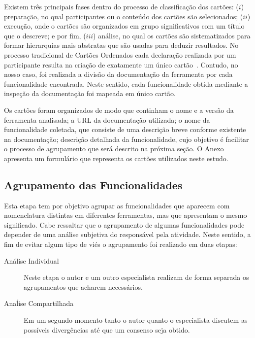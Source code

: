 Existem três principais fases dentro do processo de classificação dos cartões:
($i$) preparação, no qual participantes ou o conteúdo dos cartões são selecionados;
($ii$) execução, onde o cartões são organizados em grupo significativos com um
título que o descreve; e por fim, ($iii$) análise, no qual os cartões são
sistematizados para formar hierarquias mais abstratas que são usadas para
deduzir resultados. No processo tradicional de Cartões Ordenados cada declaração
realizada por um participante resulta na criação de exatamente um único
cartão~\cite{just2008towards}. Contudo, no nosso caso, foi realizada a divisão
da documentação da ferramenta por cada funcionalidade encontrada. Neste sentido,
cada funcionalidade obtida mediante a inspeção da documentação foi mapeada em
único cartão.

Os cartões foram organizados de modo que continham o nome e a versão da
ferramenta analisada; a URL da documentação utilizada; o nome da funcionalidade
coletada, que consiste de uma descrição breve conforme existente na
documentação; descrição detalhada da funcionalidade, cujo objetivo é facilitar o
processo de agrupamento que será descrito na próxima seção. O
Anexo~\cite{ch:app-form-cartoes-ordenados} apresenta um formulário que
representa os cartões utilizados neste estudo.

\subsection{Agrupamento das Funcionalidades}
\label{subsec:agrupamento_fucionalidades}

Esta etapa tem por objetivo agrupar as funcionalidades que aparecem com
nomenclatura distintas em diferentes ferramentas, mas que apresentam o mesmo
significado. Cabe ressaltar que o agrupamento de algumas funcionalidades pode
depender de uma análise subjetiva do responsável pela atividade. Neste sentido,
a fim de evitar algum tipo de viés o agrupamento foi realizado em duas etapas:

\begin{description}
	\item[Análise Individual] Neste etapa o autor e um outro especialista
		realizam de forma separada os agrupamentos que acharem necessários.
	\item[Anaĺise Compartilhada] Em um segundo momento tanto o autor quanto o
		especialista discutem as possíveis divergências até que um consenso seja
		obtido.
\end{description}

